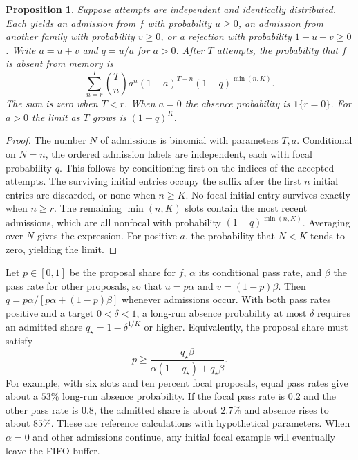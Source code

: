 \documentclass[11pt]{article}
\newtheorem{proposition}{Proposition}
\begin{document}
\begin{proposition}
Suppose attempts are independent and identically distributed.
Each yields an admission from $f$ with probability $u\ge 0$, an
admission from another family with probability $v\ge 0$, or a
rejection with probability $1-u-v\ge 0$. Write $a=u+v$ and $q=u/a$ for
$a>0$. After $T$ attempts, the probability
that $f$ is absent from memory is
\[
 \sum_{n=r}^{T}
 \binom{T}{n} a^n(1-a)^{T-n}(1-q)^{\min(n,K)}.
\]
The sum is zero when $T<r$. When $a=0$ the absence probability is
$\mathbf{1}\{r=0\}$. For $a>0$ the limit as $T$ grows is $(1-q)^K$.
\end{proposition}

\begin{proof}
The number $N$ of admissions is binomial with parameters $T,a$.
Conditional on $N=n$, the ordered admission labels are independent,
each with focal probability $q$. This follows by conditioning first
on the indices of the accepted attempts. The surviving initial
entries occupy the suffix after the first $n$ initial entries are
discarded, or none when $n\ge K$. No focal initial entry survives
exactly when $n\ge r$. The remaining $\min(n,K)$ slots contain the
most recent admissions, which are all nonfocal with probability
$(1-q)^{\min(n,K)}$. Averaging over $N$ gives the expression.
For positive $a$, the probability that $N<K$ tends to zero, yielding
the limit.
\end{proof}

Let $p\in[0,1]$ be the proposal share for $f$, $\alpha$ its
conditional pass rate, and $\beta$ the pass rate for other proposals,
so that $u=p\alpha$ and $v=(1-p)\beta$. Then
$q=p\alpha/[p\alpha+(1-p)\beta]$ whenever admissions occur.
With both pass rates positive and a target $0<\delta<1$, a long-run
absence probability at most $\delta$ requires an admitted share
$q_\star=1-\delta^{1/K}$ or higher.
Equivalently, the proposal share must satisfy
\[
 p \ge
 \frac{q_\star\beta}
      {\alpha(1-q_\star)+q_\star\beta}.
\]
For example, with six slots and ten percent focal proposals, equal
pass rates give about a $53\%$ long-run absence probability. If the
focal pass rate is $0.2$ and the other pass rate is $0.8$, the admitted
share is about $2.7\%$ and absence rises to about $85\%$. These are
reference calculations with hypothetical parameters. When $\alpha=0$
and other admissions continue, any initial focal example will
eventually leave the FIFO buffer.
\end{document}
